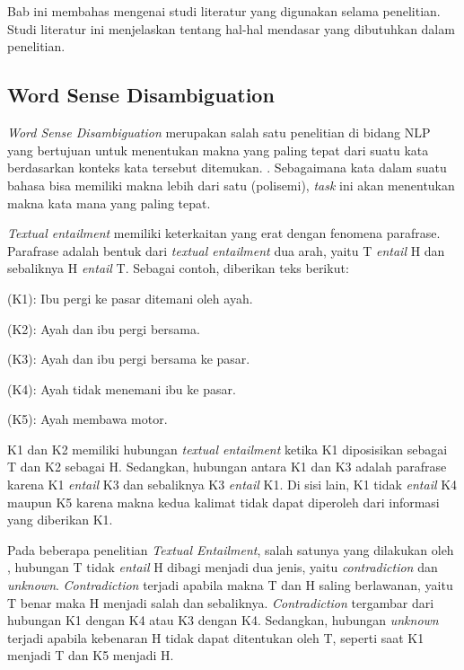 \chapter{\babDua}
Bab ini membahas mengenai studi literatur yang digunakan selama penelitian. Studi literatur ini menjelaskan tentang hal-hal mendasar yang dibutuhkan dalam penelitian.

\section{Word Sense Disambiguation}
\textit{Word Sense Disambiguation} merupakan salah satu penelitian di bidang NLP yang bertujuan untuk menentukan makna yang paling tepat dari suatu kata berdasarkan konteks kata tersebut ditemukan. \citep{dagan2005}. Sebagaimana kata dalam suatu bahasa bisa memiliki makna lebih dari satu (polisemi), \textit{task} ini akan menentukan makna kata mana yang paling tepat.

\textit{Textual entailment} memiliki keterkaitan yang erat dengan fenomena parafrase. Parafrase adalah bentuk dari \textit{textual entailment} dua arah, yaitu T \textit{entail} H dan sebaliknya H \textit{entail} T. Sebagai contoh, diberikan teks berikut:

(K1): Ibu pergi ke pasar ditemani oleh ayah.

(K2): Ayah dan ibu pergi bersama.

(K3): Ayah dan ibu pergi bersama ke pasar.

(K4): Ayah tidak menemani ibu ke pasar.

(K5): Ayah membawa motor.

\noindent K1 dan K2 memiliki hubungan \textit{textual entailment} ketika K1 diposisikan sebagai T dan K2 sebagai H. Sedangkan, hubungan antara K1 dan K3 adalah parafrase karena K1 \textit{entail} K3 dan sebaliknya K3 \textit{entail} K1. Di sisi lain, K1 tidak \textit{entail} K4 maupun K5 karena makna kedua kalimat tidak dapat diperoleh dari informasi yang diberikan K1.

Pada beberapa penelitian \textit{Textual Entailment}, salah satunya yang dilakukan oleh \cite{giampiccolo2008fourth}, hubungan T tidak \textit{entail} H dibagi menjadi dua jenis, yaitu \textit{contradiction} dan \textit{unknown}. \textit{Contradiction} terjadi apabila makna T dan H saling berlawanan, yaitu T benar maka H menjadi salah dan sebaliknya. \textit{Contradiction} tergambar dari hubungan K1 dengan K4 atau K3 dengan K4. Sedangkan, hubungan \textit{unknown} terjadi apabila kebenaran H tidak dapat ditentukan oleh T, seperti saat K1 menjadi T dan K5 menjadi H.

